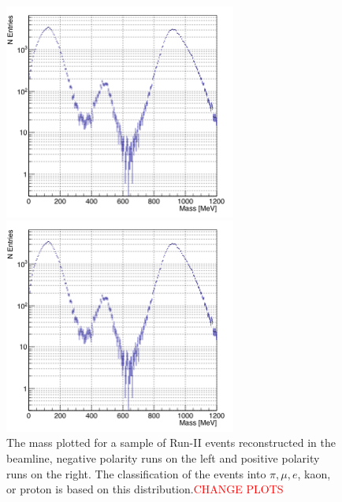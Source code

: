 \begin{figure}
\begin{minipage}[b]{.53\textwidth}  
  \centering  
\includegraphics[width=3in]{Chapter-4/Images/massRunIIPos.png}
\end{minipage}%
\begin{minipage}[b]{0.53\textwidth}  
  \centering  
\includegraphics[width=3in]{Chapter-4/Images/massRunIINeg.png}
\end{minipage}
\caption{The mass plotted for a sample of Run-II events reconstructed in the beamline, negative polarity runs on the left and positive polarity runs on the right. The classification of the events into $\pi, \mu, e$, kaon, or proton is based on this distribution.\textcolor{red}{CHANGE PLOTS}}
\label{fig:mass}
\end{figure}

